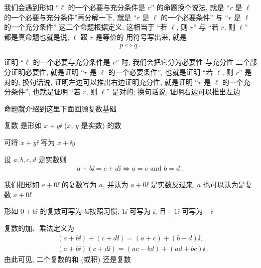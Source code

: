 \begin{remark}
    我们会遇到形如 ``$\ell$ 的一个必要与充分条件是 $r$'' 的命题\period 换个说法, 就是 ``$r$ 是 $\ell$ 的一个必要与充分条件''\period 再分解一下, 就是 ``$r$ 是 $\ell$ 的一个必要条件'' 与 ``$r$ 是 $\ell$ 的一个充分条件'' 这二个命题\period 根据定义, 这相当于 ``若 $\ell$, 则 $r$'' 与 ``若 $r$, 则 $\ell$'' 都是真命题\period 也就是说, $\ell$ 跟 $r$ 是等价的 \period 用符号写出来, 就是
    \begin{align*}
        p \Leftrightarrow q \period
    \end{align*}

    证明 ``$\ell$ 的一个必要与充分条件是 $r$'' 时, 我们会把它分为必要性  与充分性  二个部分\period 证明必要性, 就是证明 ``$r$ 是 $\ell$ 的一个必要条件'', 也就是证明 ``若 $\ell$, 则 $r$'' 是对的; 换句话说, 证明左边可以推出右边\period 证明充分性, 就是证明 ``$r$ 是 $\ell$ 的一个充分条件'', 也就是证明 ``若 $r$, 则 $\ell$'' 是对的; 换句话说, 证明右边可以推出左边\period
\end{remark}

命题就介绍到这里\period 下面回顾复数基础\period

\begin{definition}
    复数  是形如 $x + y \ii$ ($x$, $y$ 是实数) 的数\period
\end{definition}

\begin{remark}
    可将 $x + y \ii$ 写为 $x + \ii y$\period
\end{remark}

\begin{definition}
    设 $a,b,c,d$ 是实数\period 则
    \begin{align*}
        a + b \ii = c + d \ii \iff a = c \text{ and } b = d \period
    \end{align*}
\end{definition}

\begin{remark}
    我们把形如 $a+0 \ii$ 的复数写为 $a$, 并认为 $a+0 \ii$ 是实数\period 反过来, $a$ 也可以认为是复数 $a + 0 \ii$\period

    形如 $0 + b \ii$ 的复数可写为 $b \ii$\period 按照习惯, $1\ii$ 可写为 $\ii$, 且 $-1\ii$ 可写为 $-\ii$\period
\end{remark}

\begin{definition}
    复数的加、乘法定义为
    \begin{align*}
         & (a + b \ii) + (c + d \ii) = (a + c) + (b + d) \ii,          \\
         & (a + b \ii) (c + d \ii) = (ac - bd) + (ad + bc) \ii \period
    \end{align*}
    由此可见, 二个复数的和 (或积) 还是复数\period
\end{definition}


